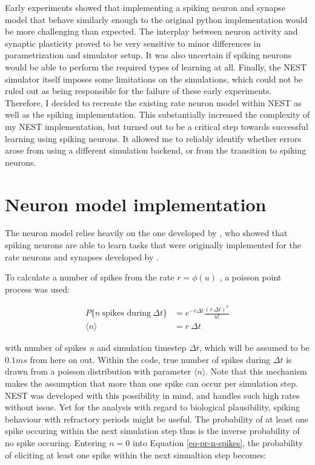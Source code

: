 Early experiments showed that implementing a spiking neuron and synapse model that behave similarly enough to the 
original python implementation would be more challenging than expected. The interplay between neuron activity and
synaptic plasticity proved to be very sensitive to 
minor differences in parametrization and simulator setup. It was also uncertain if spiking neurons would
be able to perform the required types of learning at all. Finally, the NEST simulator itself imposes some limitations
on the simulations, which could not be ruled out as being responsible for the failure of these early experiments. 
Therefore, I decided to recreate the existing rate neuron model within NEST as well as the spiking implementation.
This substantially increased the complexity of my NEST implementation, but turned out to be a critical step towards
successful learning using spiking neurons. It allowed me to reliably identify whether errors arose from using a 
different simulation backend, or from the transition to spiking neurons. 


\section{Neuron model implementation}

The neuron model relies heavily on the one developed by \cite{Stapmanns2021}, who showed that spiking neurons are able
to learn tasks that were originally implemented for the rate neurons and synapses developed by
\cite{urbanczik2014learning}. 

To calculate a number of spikes from the rate $r = \phi(u)$ , a poisson point process was used:

\begin{align}
  P\{\textit{n} \ \text{spikes during} \ \Delta t\} & = e^{-r \Delta t} \frac{(r \ \Delta t) ^ n}{n!}\label{eq-pr-n-spikes} \\
  \langle \textit{n} \rangle                        & = r \ \Delta t
\end{align}


with number of spikes \textit{n} and simulation timestep $\Delta t$, which will be assumed to be $0.1 ms$ from here on
out. Within the code, true number of spikes during $\Delta t$ is drawn from a poisson distribution with parameter
$\langle n \rangle$. Note that this mechanism makes the assumption that more than one spike can occur per simulation
step. NEST was developed with this possibility in mind, and handles such high rates without issue. Yet for the analysis
with regard to biological plausibility, spiking behaviour with refractory periods might be useful. The probability of at
least one spike occuring within the next simulation step thus is the inverse probability of no spike occuring. Entering
$n=0$ into Equation \ref{eq-pr-n-spikes}, the probability of eliciting at least one spike within the next simualtion
step becomes:

